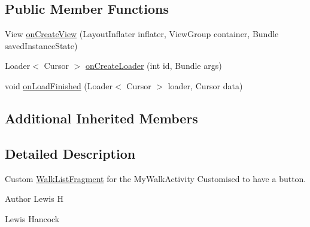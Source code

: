 \subsection*{Public Member Functions}
\begin{DoxyCompactItemize}
\item 
View \hyperlink{classuk_1_1ac_1_1swan_1_1digitaltrails_1_1fragments_1_1_my_walk_list_fragment_ab888051fe0203adcc4228d56994758e8}{on\+Create\+View} (Layout\+Inflater inflater, View\+Group container, Bundle saved\+Instance\+State)
\item 
Loader$<$ Cursor $>$ \hyperlink{classuk_1_1ac_1_1swan_1_1digitaltrails_1_1fragments_1_1_my_walk_list_fragment_a26d49064b2f1cfac6655e3c03137a550}{on\+Create\+Loader} (int id, Bundle args)
\item 
void \hyperlink{classuk_1_1ac_1_1swan_1_1digitaltrails_1_1fragments_1_1_my_walk_list_fragment_a9d9b68b38772c829efc202840031b364}{on\+Load\+Finished} (Loader$<$ Cursor $>$ loader, Cursor data)
\end{DoxyCompactItemize}
\subsection*{Additional Inherited Members}


\subsection{Detailed Description}
Custom \hyperlink{classuk_1_1ac_1_1swan_1_1digitaltrails_1_1fragments_1_1_walk_list_fragment}{Walk\+List\+Fragment} for the My\+Walk\+Activity Customised to have a button. 

\begin{DoxyAuthor}{Author}
Lewis H 

Lewis Hancock 
\end{DoxyAuthor}


